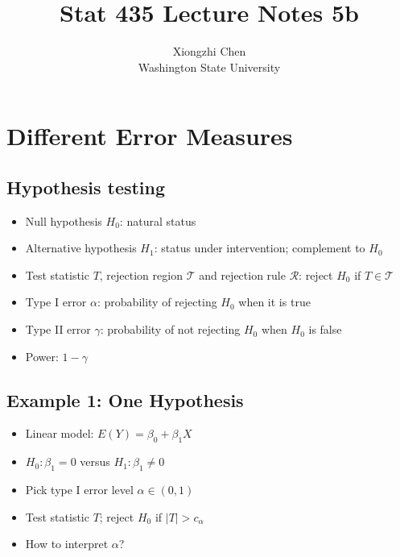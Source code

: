 \documentclass[]{article}
\title{Stat 435 Lecture Notes 5b}
\author{Xiongzhi Chen \\ Washington State University}
\date{}
\begin{document}
\maketitle

{
\setcounter{tocdepth}{2}
\tableofcontents
}
\section{}\label{section}

\section{Different Error Measures}\label{different-error-measures}

\subsection{Hypothesis testing}\label{hypothesis-testing}

\begin{itemize}
\item
  Null hypothesis \(H_0\): natural status
\item
  Alternative hypothesis \(H_1\): status under intervention; complement
  to \(H_0\)
\item
  Test statistic \(T\), rejection region \(\mathcal{T}\) and rejection
  rule \(\mathcal{R}\): reject \(H_0\) if \(T \in \mathcal{T}\)
\item
  Type I error \(\alpha\): probability of rejecting \(H_0\) when it is
  true
\item
  Type II error \(\gamma\): probability of not rejecting \(H_0\) when
  \(H_0\) is false
\item
  Power: \(1- \gamma\)
\end{itemize}

\subsection{Example 1: One Hypothesis}\label{example-1-one-hypothesis}

\begin{itemize}
\item
  Linear model: \(E(Y) = \beta_0 + \beta_1 X\)
\item
  \(H_0: \beta_1 =0\) versus \(H_1:\beta_1 \ne 0\)
\item
  Pick type I error level \(\alpha \in (0,1)\)
\item
  Test statistic \(T\); reject \(H_0\) if \(\vert T \vert > c_{\alpha}\)
\item
  How to interpret \(\alpha\)?
\end{itemize}
\end{document}
